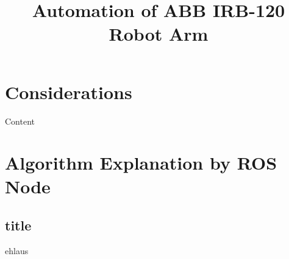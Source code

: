 \documentclass[11pt]{article}
\title{Automation of ABB IRB-120 Robot Arm}
\begin{document}
\maketitle

\section{Considerations}
Content

\section{Algorithm Explanation by ROS Node}
\subsection{title}
ehlaus 
\end{document}
